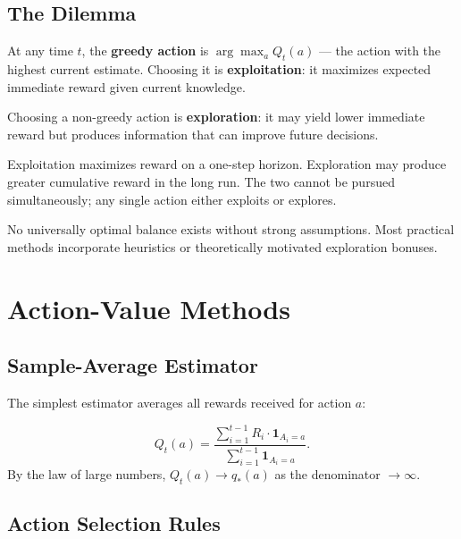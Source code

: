 \documentclass[11pt,a4paper]{article}
\theoremstyle{definition}
\theoremstyle{plain}
\theoremstyle{remark}
\begin{document}
\subsection{The Dilemma}

At any time $t$, the \textbf{greedy action} is $\arg\max_a Q_t(a)$ — the action with the highest current estimate. Choosing it is \textbf{exploitation}: it maximizes expected immediate reward given current knowledge.

Choosing a non-greedy action is \textbf{exploration}: it may yield lower immediate reward but produces information that can improve future decisions.

\begin{tcolorbox}[colback=orange!5!white,colframe=orange!75!black,title=\textbf{Exploration-Exploitation Dilemma}]
Exploitation maximizes reward on a one-step horizon. Exploration may produce greater cumulative reward in the long run. The two cannot be pursued simultaneously; any single action either exploits or explores.
\end{tcolorbox}

No universally optimal balance exists without strong assumptions. Most practical methods incorporate heuristics or theoretically motivated exploration bonuses.

\section{Action-Value Methods}

\subsection{Sample-Average Estimator}

The simplest estimator averages all rewards received for action $a$:
\begin{tcolorbox}[colback=blue!5!white,colframe=blue!60!black,title=\textbf{Sample-Average Method}]
\[
    Q_t(a) = \frac{\displaystyle\sum_{i=1}^{t-1} R_i \cdot \mathbf{1}_{A_i = a}}{\displaystyle\sum_{i=1}^{t-1} \mathbf{1}_{A_i = a}}.
\]
By the law of large numbers, $Q_t(a) \to q_*(a)$ as the denominator $\to \infty$.
\end{tcolorbox}

\subsection{Action Selection Rules}
\end{document}
